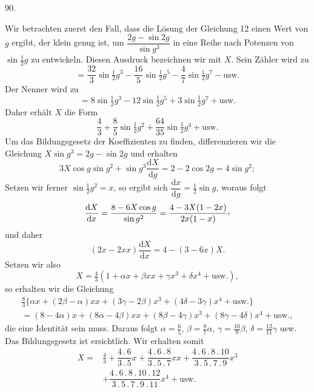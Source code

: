 \par{}\medskip
\hypertarget{native-121-article090}{}
\begin{center}90.\end{center}
Wir betrachten zuerst den Fall, dass die Lösung der Gleichung 12 einen Wert von $g$ ergibt, der klein genug ist, um $\dfrac{2g-\sin 2g}{\sin g^3}$ in eine Reihe nach Potenzen von $\sin\tfrac12 g$ zu entwickeln. Diesen Ausdruck bezeichnen wir mit $X$. Sein Zähler wird zu
\[
=\dfrac{32}{3}\sin\tfrac12 g^3-\dfrac{16}{5}\sin\tfrac12 g^5-\dfrac47\sin\tfrac12 g^7-\text{usw.}
\]
Der Nenner wird zu
\[
=8\sin\tfrac12 g^3-12\sin\tfrac12 g^5+3\sin\tfrac12 g^7+\text{usw.}
\]
Daher erhält $X$ die Form
\[
\dfrac43+\dfrac85\sin\tfrac12 g^2+\dfrac{64}{35}\sin\tfrac12 g^4+\text{usw.}
\]
Um das Bildungsgesetz der Koeffizienten zu finden, differenzieren wir die Gleichung $X\sin g^3=2g-\sin 2g$ und erhalten
\[
3X\cos g\sin g^2+\sin g^3\dfrac{\mathrm{d}X}{\mathrm{d}g}=2-2\cos 2g=4\sin g^2;
\]
Setzen wir ferner $\sin\tfrac12 g^2=x$, so ergibt sich $\dfrac{\mathrm{d}x}{\mathrm{d}g}=\tfrac12\sin g$, woraus folgt
\[
\dfrac{\mathrm{d}X}{\mathrm{d}x}=\dfrac{8-6X\cos g}{\sin g^2}=\dfrac{4-3X(1-2x)}{2x(1-x)}\mathpunct{\raisebox{.45ex}{,}}
\]
und daher
\[
(2x-2xx)\dfrac{\mathrm{d}X}{\mathrm{d}x}=4-(3-6x)X.
\]
Setzen wir also
\[
X=\tfrac43(1+\alpha x+\beta xx+\gamma x^3+\delta x^4+\text{usw.}),
\]
so erhalten wir die Gleichung
\[
\begin{gathered}
\tfrac83\{\alpha x+(2\beta-\alpha)xx+(3\gamma-2\beta)x^3+(4\delta-3\gamma)x^4+\text{usw.}\}
\\[4pt]
=(8-4\alpha)x+(8\alpha-4\beta)xx+(8\beta-4\gamma)x^3+(8\gamma-4\delta)x^4+\text{usw.},
\end{gathered}
\]
die eine Identität sein muss. Daraus folgt $\alpha=\tfrac65$, $\beta=\tfrac87\alpha$, $\gamma=\tfrac{10}{9}\beta$, $\delta=\tfrac{12}{11}\gamma$ usw. Das Bildungsgesetz ist ersichtlich. Wir erhalten somit
\[
\begin{aligned}
X={}&\tfrac43+\dfrac{4\mathbin{.}6}{3\mathbin{.}5}x+\dfrac{4\mathbin{.}6\mathbin{.}8}{3\mathbin{.}5\mathbin{.}7}xx+\dfrac{4\mathbin{.}6\mathbin{.}8\mathbin{.}10}{3\mathbin{.}5\mathbin{.}7\mathbin{.}9}x^3
\\[4pt]
&+\dfrac{4\mathbin{.}6\mathbin{.}8\mathbin{.}10\mathbin{.}12}{3\mathbin{.}5\mathbin{.}7\mathbin{.}9\mathbin{.}11}x^4+\text{usw.}
\end{aligned}
\]

